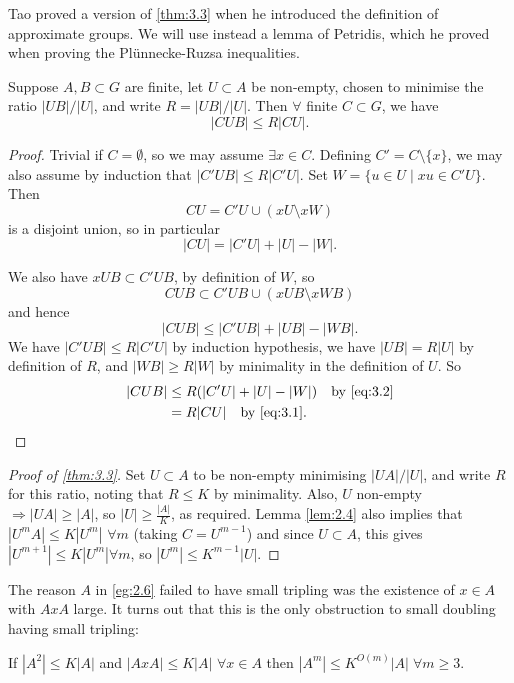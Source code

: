 \documentclass{article}
\numberwithin{equation}{section}
\begin{document}
Tao proved a version of \cref{thm:3.3} when he introduced the definition of approximate groups.
We will use instead a lemma of Petridis, which he proved when proving the Pl\"unnecke-Ruzsa inequalities.

\begin{nlemma}[Petridis]\label{lem:3.4}
  Suppose $A,B \subset G$ are finite, let $U \subset A$ be non-empty, chosen to minimise the ratio $|UB|/|U|$, and write $R = |UB|/|U|$.
  Then $\forall$ finite $C \subset G$, we have
  \begin{equation*}
    |CUB| \leq R |CU|.
  \end{equation*}
\end{nlemma}
\begin{proof}
  Trivial if $C = \emptyset$, so we may assume $\exists x \in C$. Defining $C' = C \setminus \{x\}$, we may also assume by induction that $|C' U B| \leq R |C' U|$.
  Set $W = \{u \in U \mid xu \in C' U\}$. Then
  \begin{equation*}
    CU = C' U \cup (x U \setminus x W)
  \end{equation*}
  is a disjoint union, so in particular
  \begin{equation}
    |CU| = |C' U| + |U| - |W|. \label{eq:3.1}
  \end{equation}

  We also have $x U B \subset C' U B$, by definition of $W$, so
  \begin{equation*}
    CUB \subset C' U B \cup (x U B \setminus x W B)
  \end{equation*}
  and hence
  \begin{equation}
    |CUB| \leq |C' U B| + |UB| - |WB|. \label{eq:3.2}
  \end{equation}
  We have $|C' U B| \leq R |C' U|$ by induction hypothesis, we have $|UB| = R|U|$ by definition of $R$, and $|WB| \geq R|W|$ by minimality in the definition of $U$. So
  \begin{align*}
    |CUB| &\leq R (|C' U| + |U| - |W|) \quad \text{by \eqref{eq:3.2}} \\
          &= R|CU| \quad \text{by \eqref{eq:3.1}}.
  \end{align*}
\end{proof}
\begin{proof}[Proof of \cref{thm:3.3}]
  Set $U \subset A$ to be non-empty minimising $|UA| / |U|$, and write $R$ for this ratio, noting that $R \leq K$ by minimality.
  Also, $U$ non-empty $\Rightarrow |UA| \geq |A|$, so $|U| \geq \frac{|A|}{K}$, as required.
  Lemma \cref{lem:2.4} also implies that $|U^m A| \leq K|U^m|$ $\forall m$ (taking $C = U^{m-1}$) and since $U \subset A$, this gives $|U^{m+1}| \leq K |U^m| \forall m$, so $|U^m| \leq K^{m-1} |U|$.
\end{proof}

The reason $A$ in \cref{eg:2.6} failed to have small tripling was the existence of $x \in A$ with $A x A$ large. It turns out that this is the only obstruction to small doubling having small tripling:
\begin{thm}\label{thm:3.5}
  If $|A^2| \leq K|A|$ and $|AxA| \leq K|A|$ $\forall x \in A$ then $|A^m| \leq K^{O(m)} |A| \; \forall m \geq 3$.
\end{thm}
\printindex
\end{document}
